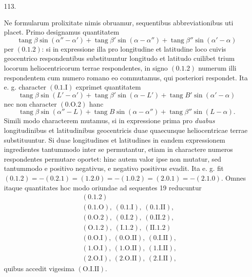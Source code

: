 \par{}\medskip
{}
\begin{center}113.\end{center}
Ne formularum prolixitate nimis obruamur, sequentibus abbreviationibus uti placet. Primo designamus quantitatem
\[
\operatorname{tang}\beta\sin(\alpha''-\alpha')+\operatorname{tang}\beta'\sin(\alpha-\alpha'')+\operatorname{tang}\beta''\sin(\alpha'-\alpha)
\]
per $(0.1.2)$: si in expressione illa pro longitudine et latitudine loco cuivis geocentrico respondentibus substituuntur longitudo et latitudo cuilibet trium locorum heliocentricorum terrae respondentes, in signo $(0.1.2)$ numerum illi respondentem cum numero romano eo commutamus, qui posteriori respondet. Ita e. g. character $(0.1.\mathrm{I})$ exprimet quantitatem
\[
\operatorname{tang}\beta\sin(L'-\alpha')+\operatorname{tang}\beta'\sin(\alpha-L')+\operatorname{tang}B'\sin(\alpha'-\alpha)
\]
nec non character $(0.\mathrm{O}.2)$ hanc
\[
\operatorname{tang}\beta\sin(\alpha''-L)+\operatorname{tang}B\sin(\alpha-\alpha'')+\operatorname{tang}\beta''\sin(L-\alpha).
\]
Simili modo characterem mutamus, si in expressione prima pro \emph{duabus} longitudinibus et latitudinibus geocentricis duae quaecunque heliocentricae terrae substituuntur. Si duae longitudines et latitudines in eandem expressionem ingredientes tantummodo inter se permutantur, etiam in charactere numeros respondentes permutare oportet: hinc autem valor ipse non mutatur, sed tantummodo e positivo negativus, e negativo positivus evadit. Ita e. g. fit $(0.1.2)=-(0.2.1)=(1.2.0)=-(1.0.2)=(2.0.1)=-(2.1.0)$. Omnes itaque quantitates hoc modo oriundae ad sequentes 19 reducuntur
\[
\begin{aligned}
&(0.1.2)\\
&(0.1.\mathrm{O}),\ (0.1.\mathrm{I}),\ (0.1.\mathrm{II}),\\
&(0.\mathrm{O}.2),\ (0.\mathrm{I}.2),\ (0.\mathrm{II}.2),\\
&(\mathrm{O}.1.2),\ (\mathrm{I}.1.2),\ (\mathrm{II}.1.2)\\
&(0.\mathrm{O}.\mathrm{I}),\ (0.\mathrm{O}.\mathrm{II}),\ (0.\mathrm{I}.\mathrm{II}),\\
&(1.\mathrm{O}.\mathrm{I}),\ (1.\mathrm{O}.\mathrm{II}),\ (1.\mathrm{I}.\mathrm{II}),\\
&(2.\mathrm{O}.\mathrm{I}),\ (2.\mathrm{O}.\mathrm{II}),\ (2.\mathrm{I}.\mathrm{II}),
\end{aligned}
\]
quibus accedit vigesima $(\mathrm{O}.\mathrm{I}.\mathrm{II})$.
